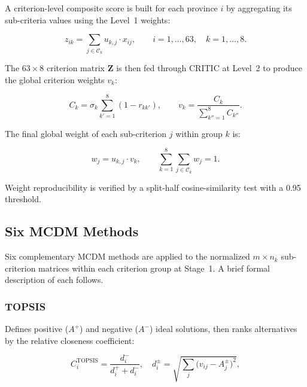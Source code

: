 \documentclass[12pt, a4paper]{article}
\begin{document}
A criterion-level composite score is built for each province $i$ by
aggregating its sub-criteria values using the Level~1 weights:

\begin{equation}
  z_{ik} = \sum_{j \in \mathcal{C}_k} u_{k,j} \cdot x_{ij},
  \qquad i = 1,\ldots,63, \quad k = 1,\ldots,8.
  \label{eq:composite}
\end{equation}

The $63 \times 8$ criterion matrix $\mathbf{Z}$ is then fed through CRITIC at
Level~2 to produce the global criterion weights $v_k$:

\begin{equation}
  C_k = \sigma_k \sum_{k'=1}^{8} (1 - r_{kk'}), \qquad
  v_k = \frac{C_k}{\displaystyle\sum_{k''=1}^{8} C_{k''}}.
  \label{eq:global_weights}
\end{equation}

The final global weight of each sub-criterion $j$ within group $k$ is:

\begin{equation}
  w_j = u_{k,j} \cdot v_k, \qquad \sum_{k=1}^{8}\sum_{j \in \mathcal{C}_k} w_j = 1.
  \label{eq:global_sc_weights}
\end{equation}

Weight reproducibility is verified by a split-half cosine-similarity test with a
0.95 threshold.

\subsection{Six MCDM Methods}

Six complementary MCDM methods are applied to the normalized $m \times n_k$
sub-criterion matrices within each criterion group at Stage~1. A brief
formal description of each follows.

\subsubsection{TOPSIS \citep{HwangYoon1981}}

Defines positive ($A^+$) and negative ($A^-$) ideal solutions, then ranks
alternatives by the relative closeness coefficient:

\begin{equation}
  C_i^{\text{TOPSIS}} = \frac{d_i^-}{d_i^+ + d_i^-},
  \quad d_i^{\pm} = \sqrt{\sum_j \bigl(v_{ij} - A_j^{\pm}\bigr)^2},
  \label{eq:topsis}
\end{equation}
\end{document}
